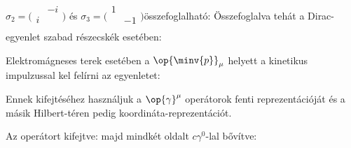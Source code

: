                             $\sigma_2=\bigl(\begin{smallmatrix}
                                        & -i \\
                                       i & \\
                                      \end{smallmatrix}\bigr)$ és 
                            $\sigma_3=\bigl(\begin{smallmatrix}
                                       1 &  \\
                                        & -1\\
                                      \end{smallmatrix}\bigr)$összefoglalható: 
   Összefoglalva tehát a Dirac-egyenlet szabad részecskék esetében:
   
   Elektromágneses terek esetében a $\op{\minv{p}}_\mu$ helyett a kinetikus impulzussal kel felírni az egyenletet:
   
   Ennek kifejtéséhez használjuk a $\op{\gamma}^\mu$ operátorok fenti reprezentációját és a másik Hilbert-téren pedig koordináta-reprezentációt. 
   
   Az operátort kifejtve:
   majd mindkét oldalt $c\gamma^0$-lal bővítve:
   
